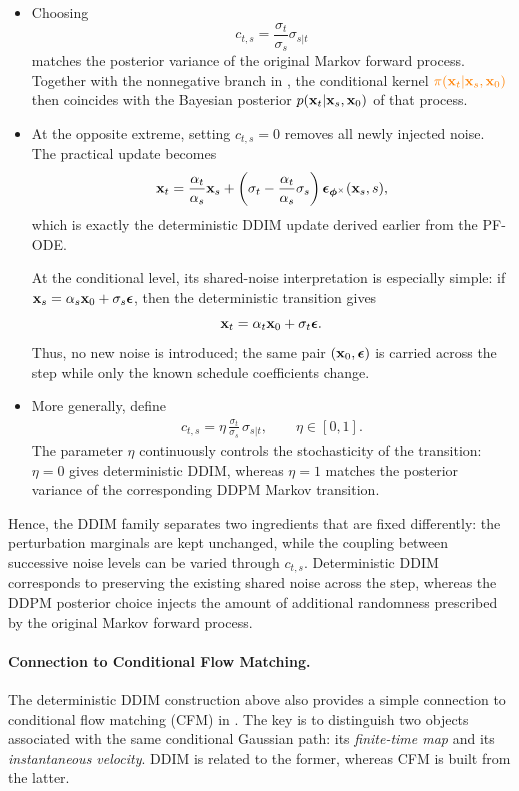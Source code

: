 \begin{itemize}
\item {}
Choosing
\[
c_{t,s}
=
\frac{\sigma_t}{\sigma_s}\sigma_{s|t}
\]
matches the posterior variance of the original Markov forward process.
Together with the nonnegative branch in
, the conditional kernel
${\color{orange}\pi({\mathbf{x}}_t|{\mathbf{x}}_s,{\mathbf{x}}_0)}$ then coincides with the
Bayesian posterior $p({\mathbf{x}}_t|{\mathbf{x}}_s,{\mathbf{x}}_0)$ of that process.

\item {}
At the opposite extreme, setting $c_{t,s}=0$ removes all newly injected
noise. The practical update becomes
\[
{\mathbf{x}}_t
=
\frac{\alpha_t}{\alpha_s}{\mathbf{x}}_s
+
\left(
\sigma_t
-
\frac{\alpha_t}{\alpha_s}\sigma_s
\right)
{\bm{\epsilon}}_{\bm{\phi}^\times}({\mathbf{x}}_s,s),
\]
which is exactly the deterministic DDIM update derived earlier from the
PF-ODE.

At the conditional level, its shared-noise interpretation is especially
simple: if
${\mathbf{x}}_s=\alpha_s{\mathbf{x}}_0+\sigma_s{\bm{\epsilon}}$, then the deterministic transition
gives
\[
{\mathbf{x}}_t
=
\alpha_t{\mathbf{x}}_0+\sigma_t{\bm{\epsilon}}.
\]
Thus, no new noise is introduced; the same pair $({\mathbf{x}}_0,{\bm{\epsilon}})$ is carried
across the step while only the known schedule coefficients change.

\item {}
More generally, define
\begin{align}
\label{eq:eta-ddim}
c_{t,s}
=
\eta\,
\frac{\sigma_t}{\sigma_s}\,
\sigma_{s|t},
\qquad
\eta\in[0,1].
\end{align}
The parameter $\eta$ continuously controls the stochasticity of the
transition: $\eta=0$ gives deterministic DDIM, whereas $\eta=1$ matches the
posterior variance of the corresponding DDPM Markov transition.
\end{itemize}

Hence, the DDIM family separates two ingredients that are fixed differently:
the perturbation marginals are kept unchanged, while the coupling between
successive noise levels can be varied through $c_{t,s}$. Deterministic DDIM
corresponds to preserving the existing shared noise across the step, whereas
the DDPM posterior choice injects the amount of additional randomness
prescribed by the original Markov forward process.

\paragraph{Connection to Conditional Flow Matching.}
The deterministic DDIM construction above also provides a simple connection
to conditional flow matching (CFM) in . The key is to distinguish two objects
associated with the same conditional Gaussian path: its \emph{finite-time
map} and its \emph{instantaneous velocity}. DDIM is related to the former,
whereas CFM is built from the latter.

